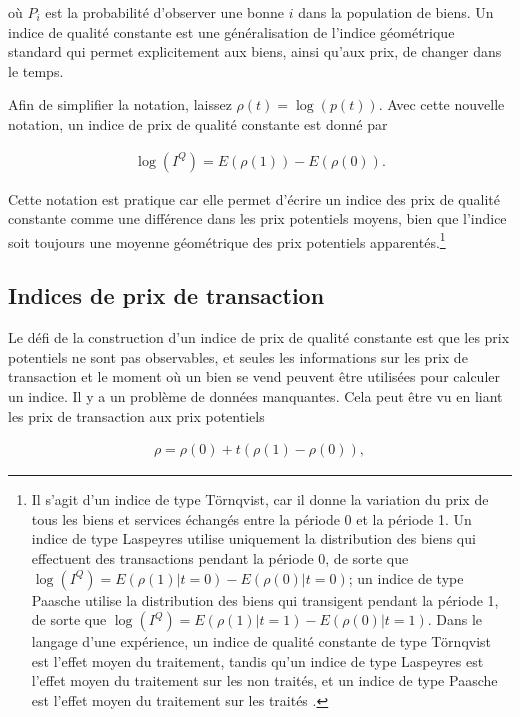 \documentclass[]{article}
\begin{document}
où \(P_{i}\) est la probabilité d'observer une bonne \(i\) dans la population de biens. Un indice de qualité constante est une généralisation de l'indice géométrique standard qui permet explicitement aux biens, ainsi qu'aux prix, de changer dans le temps.

Afin de simplifier la notation, laissez \(\rho(t) = \log(p(t))\). Avec cette nouvelle notation, un indice de prix de qualité constante est donné par

\begin{align*}
\log (I^{Q}) = E(\rho(1)) - E(\rho(0)).
\end{align*}

Cette notation est pratique car elle permet d'écrire un indice des prix de qualité constante comme une différence dans les prix potentiels moyens, bien que l'indice soit toujours une moyenne géométrique des prix potentiels apparentés.\footnote{Il s'agit d'un indice de type Törnqvist, car il donne la variation du prix de tous les biens et services échangés entre la période 0 et la période 1. Un indice de type Laspeyres utilise uniquement la distribution des biens qui effectuent des transactions pendant la période 0, de sorte que \(\log(I^{Q}) = E(\rho(1) | t = 0) - E(\rho(0) | t = 0)\); un indice de type Paasche utilise la distribution des biens qui transigent pendant la période 1, de sorte que \(\log(I^{Q}) = E(\rho(1) | t = 1) - E(\rho(0) | t = 1)\). Dans le langage d'une expérience, un indice de qualité constante de type Törnqvist est l'effet moyen du traitement, tandis qu'un indice de type Laspeyres est l'effet moyen du traitement sur les non traités, et un indice de type Paasche est l'effet moyen du traitement sur les traités .}

\hypertarget{indices-de-prix-de-transaction}{%
\subsection{Indices de prix de transaction}\label{indices-de-prix-de-transaction}}

Le défi de la construction d'un indice de prix de qualité constante est que les prix potentiels ne sont pas observables, et seules les informations sur les prix de transaction et le moment où un bien se vend peuvent être utilisées pour calculer un indice. Il y a un problème de données manquantes. Cela peut être vu en liant les prix de transaction aux prix potentiels

\begin{align*}
\rho = \rho(0) + t (\rho(1) - \rho(0)),
\end{align*}
\end{document}
